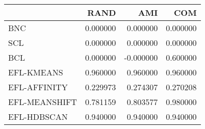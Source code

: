 \begin{tabular}{lrrr}
\toprule
 & RAND & AMI & COM \\
\midrule
BNC & 0.000000 & 0.000000 & 0.000000 \\
SCL & 0.000000 & 0.000000 & 0.000000 \\
BCL & 0.000000 & -0.000000 & 0.600000 \\
EFL-KMEANS & 0.960000 & 0.960000 & 0.960000 \\
EFL-AFFINITY & 0.229973 & 0.274307 & 0.270208 \\
EFL-MEANSHIFT & 0.781159 & 0.803577 & 0.980000 \\
EFL-HDBSCAN & 0.940000 & 0.940000 & 0.940000 \\
\bottomrule
\end{tabular}
